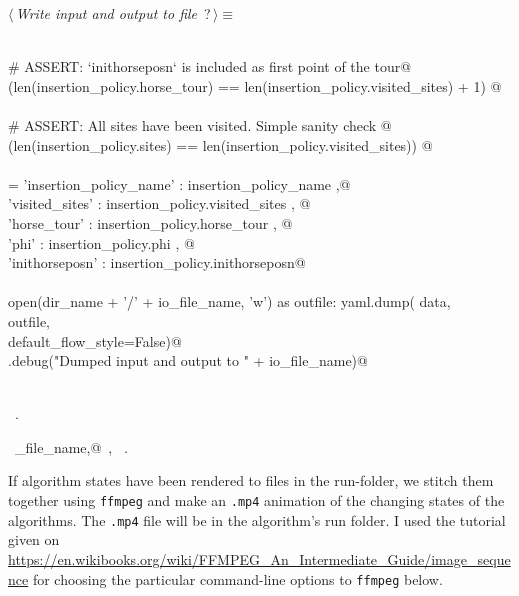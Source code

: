 \documentclass[11.5pt]{report}
\begin{document}
\begin{flushleft} \small\label{scrap28}\raggedright\small
{} $\langle\,${\itshape Write input and output to file}\nobreak\ {\footnotesize {?}}$\,\rangle\equiv$
\vspace{-1ex}
\begin{list}{}{} \item
\mbox{}\verb@@\\
\mbox{}\verb@# ASSERT: `inithorseposn` is included as first point of the tour@\\
\mbox{}\verb@assert(len(insertion_policy.horse_tour) == len(insertion_policy.visited_sites) + 1) @\\
\mbox{}\verb@@\\
\mbox{}\verb@# ASSERT: All sites have been visited. Simple sanity check @\\
\mbox{}\verb@assert(len(insertion_policy.sites)   == len(insertion_policy.visited_sites)) @\\
\mbox{}\verb@@\\
\mbox{}\verb@data = {'insertion_policy_name' : insertion_policy_name   ,@\\
\mbox{}\verb@        'visited_sites'  : insertion_policy.visited_sites , @\\
\mbox{}\verb@        'horse_tour'     : insertion_policy.horse_tour    , @\\
\mbox{}\verb@        'phi'            : insertion_policy.phi           , @\\
\mbox{}\verb@        'inithorseposn'  : insertion_policy.inithorseposn}@\\
\mbox{}\verb@@\\
\mbox{}\verb@with open(dir_name + '/' + io_file_name, 'w') as outfile:     yaml.dump( data, \@\\
\mbox{}\verb@                outfile, \@\\
\mbox{}\verb@                default_flow_style=False)@\\
\mbox{}\verb@logger.debug("Dumped input and output to " + io_file_name)@\\
\mbox{}\verb@@\\
\mbox{}\verb@@{\NWsep}
\end{list}
\vspace{-1.5ex}
\footnotesize
\begin{list}{}{\setlength{\itemsep}{-\parsep}\setlength{\itemindent}{-\leftmargin}}
\item \NWtxtMacroRefIn\ .
\item \NWtxtIdentsUsed\nobreak\  \verb@io_file_name,@\nobreak\ , \verb@logger@\nobreak\ .
\item{}
\end{list}
\vspace{4ex}
\end{flushleft}
\newchunk If algorithm states have been rendered to files in the run-folder, we stitch them together using \verb|ffmpeg|
and make an \verb|.mp4| animation of the changing states of the algorithms. The \verb|.mp4| file will be in the algorithm's
run folder. I used the  tutorial given on \url{https://en.wikibooks.org/wiki/FFMPEG_An_Intermediate_Guide/image_sequence}
for choosing the particular command-line options to \verb|ffmpeg| below. 
\end{document}
